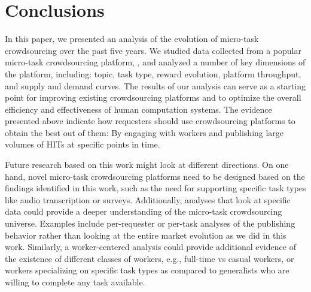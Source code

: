 \section{Conclusions}\label{sec:conc}

In this paper, we presented an analysis of the evolution of micro-task crowdsourcing over the past five years.
We studied data collected from a popular micro-task crowdsourcing platform, \amt{},
and analyzed a number of key dimensions of the platform, including: topic, task type, reward evolution, platform throughput, and supply and demand curves. The results of our analysis can serve as a starting point for improving existing crowdsourcing platforms and to optimize the overall efficiency and effectiveness of human computation systems. The evidence presented above indicate how requesters should use crowdsourcing platforms to obtain the best out of them: By engaging with workers and publishing large volumes of HITs at specific points in time. 


Future research based on this work might look at different directions. On one hand, novel micro-task crowdsourcing platforms need to be designed based on the findings identified in this work, such as the need for supporting specific task types like audio transcription or surveys. 
% 
Additionally, analyses that look at specific data could provide a deeper understanding of the micro-task crowdsourcing universe. Examples include per-requester or per-task analyses of the publishing behavior rather than looking at the entire market evolution as we did in this work. 
Similarly, a worker-centered analysis could provide additional evidence of the existence of different classes of workers, e.g., full-time vs casual workers, or workers specializing on specific task types as compared to generalists who are willing to complete any task available.